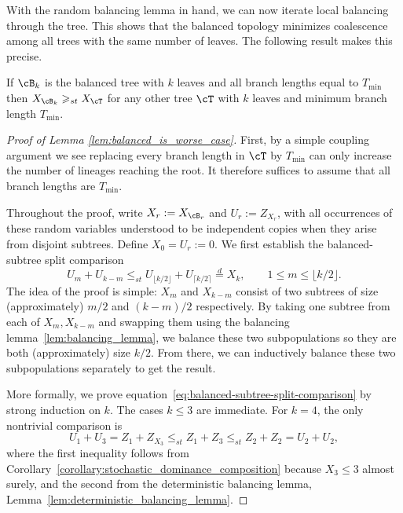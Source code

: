 With the random balancing lemma in hand, we can now iterate local balancing
through the tree. This shows that the balanced topology minimizes coalescence
among all trees with the same number of leaves. The following result makes this
precise.

\begin{lemma}
\label{lem:balanced_is_worse_case}
    If $\cB_k$ is the balanced tree with $k$ leaves and all branch lengths
    equal to $T_{\mathrm{min}}$ then $X_{\cB_k} \geq_{st} X_\cT$ for any other
    tree $\cT$ with $k$ leaves and minimum branch length $T_{\mathrm{min}}$.
\end{lemma}

\begin{proof}[Proof of Lemma \ref{lem:balanced_is_worse_case}]
First, by a simple coupling argument we see replacing every branch length in $\cT$ by $T_{\mathrm{min}}$ can only
increase the number of lineages reaching the root. It therefore suffices to
assume that all branch lengths are $T_{\mathrm{min}}$.

Throughout the proof, write $X_r:=X_{\cB_r}$ and $U_r:=Z_{X_r}$, with all
occurrences of these random variables understood to be independent copies when
they arise from disjoint subtrees. Define $X_0 = U_r := 0$. We first establish the balanced-subtree split
comparison
%
\begin{equation}
U_m+U_{k-m}
\leq_{st}
U_{\lfloor k/2\rfloor}+U_{\lceil k/2\rceil} \overset{d}{=} X_k,
\qquad 1\leq m\leq\lfloor k/2\rfloor.
\label{eq:balanced-subtree-split-comparison}
\end{equation}
%
The idea of the proof is simple: $X_m$ and $X_{k-m}$ consist of two subtrees of
size (approximately) $m/2$ and $(k-m)/2$ respectively. By taking one subtree from each of $X_m, X_{k-m}$ and swapping them 
using the balancing lemma~\ref{lem:balancing_lemma}, we balance these two subpopulations so they are both (approximately) size $k/2$. 
From there, we can inductively balance these two subpopulations separately to get the result.

More formally, we prove equation~\eqref{eq:balanced-subtree-split-comparison} by strong induction
on $k$. The cases $k\leq3$ are
immediate. For $k=4$, the only nontrivial comparison is
\[
U_1+U_3=Z_1+Z_{X_3}
\leq_{st} Z_1+Z_3
\leq_{st} Z_2+Z_2
=U_2+U_2,
\]
where the first inequality follows from Corollary~\ref{corollary:stochastic_dominance_composition}
because $X_3\leq3$ almost surely, and the second from the deterministic balancing lemma,
Lemma~\ref{lem:deterministic_balancing_lemma}.


\end{proof}
